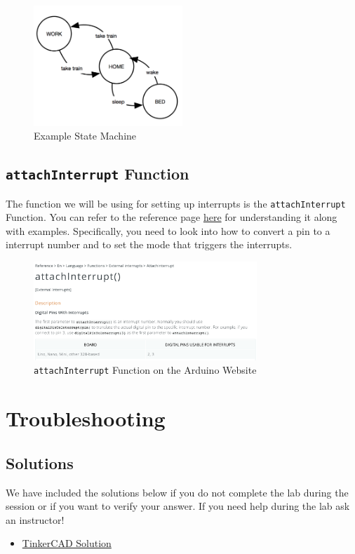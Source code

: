 \documentclass{article}
\begin{document}
        \begin{figure}[ht]
            \centering
            \includegraphics[width = 0.5\textwidth]{images/StateMachine.png}
            \caption{Example State Machine}
        \end{figure}
        
    \subsection{\texttt{attachInterrupt} Function} \label{attachinterrupt}
        The function we will be using for setting up interrupts is the \texttt{attachInterrupt} Function. You can refer to the reference page \href{https://www.arduino.cc/reference/en/language/functions/external-interrupts/attachinterrupt}{here} for understanding it along with examples. Specifically, you need to look into how to convert a pin to a interrupt number and to set the mode that triggers the interrupts.
        
        \begin{figure}[ht]
            \centering
            \includegraphics[width = 0.75\textwidth]{images/AttachInterrupt.png}
            \caption{\texttt{attachInterrupt} Function on the Arduino Website}
        \end{figure}
        
\section{Troubleshooting}
    \subsection{Solutions}
    We have included the solutions below if you do not complete the lab during the session or if you want to verify your answer. If you need help during the lab ask an instructor!
\begin{itemize}
    \item \href{https://www.tinkercad.com/things/cGKh5f8nkDv}{TinkerCAD Solution}
    \end{itemize}
\end{document}
